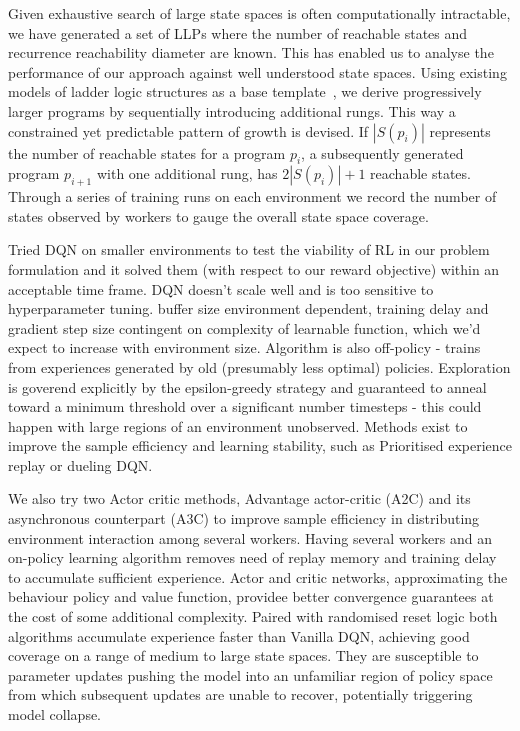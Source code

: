 \documentclass[conference,compsoc]{IEEEtran}
\begin{document}
Given exhaustive search of large state spaces is often computationally intractable, we have generated a set of LLPs where the number of reachable states and recurrence reachability diameter are known. This has enabled us to analyse the performance of our approach against well understood state spaces. Using existing models of ladder logic structures as a base template~\cite{james2013verification}, we derive progressively larger programs by sequentially introducing additional rungs. This way a constrained yet predictable pattern of growth is devised. If $|S(p_i)|$ represents the number of reachable states for a program $p_i$, a subsequently generated program $p_{i+1}$ with one additional rung, has $2|S(p_i)|+1$ reachable states. Through a series of training runs on each environment we record the number of states observed by workers to gauge the overall state space coverage. 

Tried DQN on smaller environments to test the viability of RL in our problem formulation and it solved them (with respect to our reward objective) within an acceptable time frame. 
DQN doesn't scale well and is too sensitive to hyperparameter tuning. buffer size environment dependent, training delay and gradient step size contingent on complexity of learnable function, which we'd expect to increase with environment size. Algorithm is also off-policy - trains from experiences generated by old (presumably less optimal) policies. Exploration is goverend explicitly by the epsilon-greedy strategy and guaranteed to anneal toward a minimum threshold over a significant number timesteps - this could happen with large regions of an environment unobserved. Methods exist to improve the sample efficiency and learning stability, such as Prioritised experience replay or dueling DQN.

We also try two Actor critic methods, Advantage actor-critic (A2C) and its asynchronous counterpart (A3C) to improve sample efficiency in distributing environment interaction among several workers. Having several workers and an on-policy learning algorithm removes need of replay memory and training delay to accumulate sufficient experience. Actor and critic networks, approximating the behaviour policy and value function, providee better convergence guarantees at the cost of some additional complexity. Paired with randomised reset logic both algorithms accumulate experience faster than Vanilla DQN, achieving good coverage on a range of medium to large state spaces. They are susceptible to parameter updates pushing the model into an unfamiliar region of policy space from which subsequent updates are unable to recover, potentially triggering model collapse.
\end{document}
